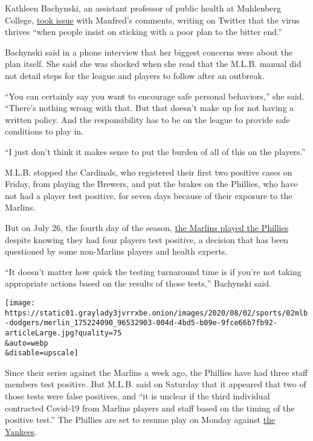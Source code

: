 Kathleen Bachynski, an assistant professor of public health at
Muhlenberg College,
\href{https://twitter.com/bachyns/status/1289665507117772800}{took
issue} with Manfred's comments, writing on Twitter that the virus
thrives ``when people insist on sticking with a poor plan to the bitter
end.''

Bachynski said in a phone interview that her biggest concerns were about
the plan itself. She said she was shocked when she read that the M.L.B.
manual did not detail steps for the league and players to follow after
an outbreak.

``You can certainly say you want to encourage safe personal behaviors,''
she said. ``There's nothing wrong with that. But that doesn't make up
for not having a written policy. And the responsibility has to be on the
league to provide safe conditions to play in.

``I just don't think it makes sense to put the burden of all of this on
the players.''

M.L.B. stopped the Cardinals, who registered their first two positive
cases on Friday, from playing the Brewers, and put the brakes on the
Phillies, who have not had a player test positive, for seven days
because of their exposure to the Marlins.

But on July 26, the fourth day of the season,
\href{https://www.nytimes3xbfgragh.onion/2020/07/27/sports/baseball/marlins-game-canceled.html}{the
Marlins played the Phillies} despite knowing they had four players test
positive, a decision that has been questioned by some non-Marlins
players and health experts.

``It doesn't matter how quick the testing turnaround time is if you're
not taking appropriate actions based on the results of those tests,''
Bachynski said.

\texttt{[image: https://static01.graylady3jvrrxbe.onion/images/2020/08/02/sports/02mlb-dodgers/merlin\_175224090\_96532903-004d-4bd5-b09e-9fce66b7fb92-articleLarge.jpg?quality=75\\\&auto=webp\\\&disable=upscale]}

Since their series against the Marlins a week ago, the Phillies have had
three staff members test positive. But M.L.B. said on Saturday that it
appeared that two of those tests were false positives, and ``it is
unclear if the third individual contracted Covid-19 from Marlins players
and staff based on the timing of the positive test.'' The Phillies are
set to resume play on Monday against
\href{https://www.nytimes3xbfgragh.onion/2020/07/29/sports/baseball/yankees-schedule.html}{the
Yankees}.

